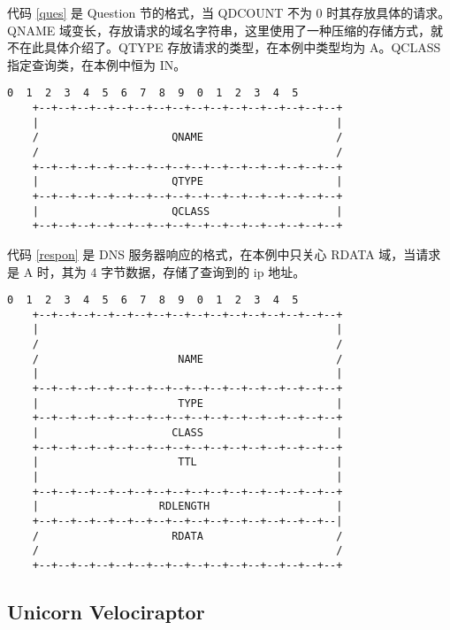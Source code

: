 \documentclass[a4paper,11pt,UTF8,AutoFakeBold= {2.88}]{ctexart}
\begin{document}
代码 \ref{ques} 是 Question 节的格式，当 QDCOUNT 不为 0 时其存放具体的请求。QNAME 域变长，存放请求的域名字符串，这里使用了一种压缩的存储方式，就不在此具体介绍了。QTYPE 存放请求的类型，在本例中类型均为 A。QCLASS 指定查询类，在本例中恒为 IN。

\begin{lstlisting}[label={ques}, numbers=none,caption={Question section format}, captionpos=b]
    0  1  2  3  4  5  6  7  8  9  0  1  2  3  4  5
    +--+--+--+--+--+--+--+--+--+--+--+--+--+--+--+--+
    |                                               |
    /                     QNAME                     /
    /                                               /
    +--+--+--+--+--+--+--+--+--+--+--+--+--+--+--+--+
    |                     QTYPE                     |
    +--+--+--+--+--+--+--+--+--+--+--+--+--+--+--+--+
    |                     QCLASS                    |
    +--+--+--+--+--+--+--+--+--+--+--+--+--+--+--+--+
\end{lstlisting}

代码 \ref{respon} 是 DNS 服务器响应的格式，在本例中只关心 RDATA 域，当请求是 A 时，其为 4 字节数据，存储了查询到的 ip 地址。

\begin{lstlisting}[label={respon}, numbers=none,caption={Resource record format}, captionpos=b]
    0  1  2  3  4  5  6  7  8  9  0  1  2  3  4  5
    +--+--+--+--+--+--+--+--+--+--+--+--+--+--+--+--+
    |                                               |
    /                                               /
    /                      NAME                     /
    |                                               |
    +--+--+--+--+--+--+--+--+--+--+--+--+--+--+--+--+
    |                      TYPE                     |
    +--+--+--+--+--+--+--+--+--+--+--+--+--+--+--+--+
    |                     CLASS                     |
    +--+--+--+--+--+--+--+--+--+--+--+--+--+--+--+--+
    |                      TTL                      |
    |                                               |
    +--+--+--+--+--+--+--+--+--+--+--+--+--+--+--+--+
    |                   RDLENGTH                    |
    +--+--+--+--+--+--+--+--+--+--+--+--+--+--+--+--|
    /                     RDATA                     /
    /                                               /
    +--+--+--+--+--+--+--+--+--+--+--+--+--+--+--+--+
\end{lstlisting}

\subsection{Unicorn Velociraptor}
\end{document}
